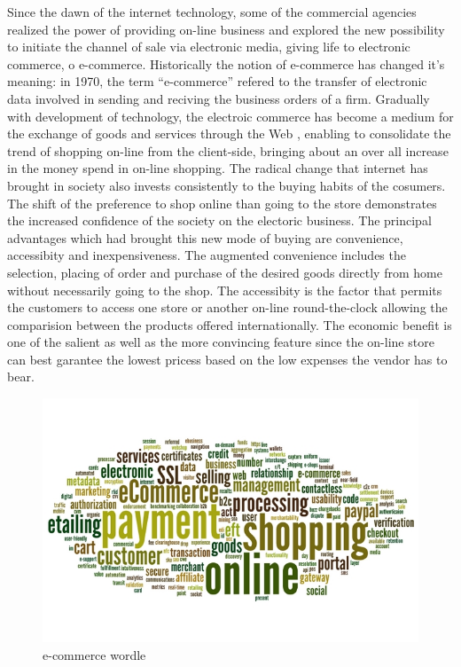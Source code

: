 Since the dawn of the internet technology, some of the commercial agencies realized the power of providing on-line business and explored the new possibility to initiate the channel of sale via electronic media, giving life to electronic commerce, o e-commerce.
\newline
Historically the notion of e-commerce has changed it's meaning: in 1970, the term “e-commerce” refered to the transfer of electronic data involved in sending and reciving the business orders of a firm. Gradually with development of technology, the electroic commerce has become a medium for the exchange of goods and services through the Web \cite{commerce_intro_1}, enabling to consolidate the trend of shopping on-line from the client-side, bringing about an over all increase in the money spend in on-line shopping.
\newline
The radical change that internet has brought in society also invests consistently to the buying habits of the cosumers. The shift of the preference to shop online than going to the store demonstrates the increased confidence of the society on the electoric business.
\newline
The principal advantages which had brought this new mode of buying are convenience, accessibity and inexpensiveness.
\newline
The augmented convenience includes the selection, placing of order and purchase of the desired goods directly from home without necessarily going to the shop.
\newline
The accessibity is the factor that permits the customers to access one store or another on-line round-the-clock allowing the comparision between the products offered internationally.
\newline
The economic benefit is one of the salient as well as the more convincing feature since the on-line store can best garantee the lowest pricess based on the low expenses the vendor has to bear.
\begin{figure}[htb]
 \centering
 \includegraphics[width=0.8\linewidth]{images/introduction/ecommerce-wordle.jpg}\hfill
 \caption[e-commerce wordle]{e-commerce wordle}
 \label{fig:e_commerce_wordle}
\end{figure}
